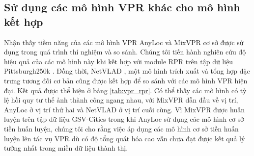 \subsection{Sử dụng các mô hình VPR khác cho mô hình kết hợp}

Nhận thấy tiềm năng của các mô hình VPR AnyLoc \cite{keetha2023anyloc} và MixVPR cơ sở \cite{alibey2023mixvpr} được sử dụng trong quá trình thí nghiệm và so sánh. Chúng tôi tiến hành nghiên cứu độ hiệu quả của các mô hình này khi kết hợp với module RPR trên tập dữ liệu Pittsburgh250k \cite{6618963}. Đồng thời, NetVLAD \cite{arandjelovic2016netvlad}, một mô hình trích xuất và tổng hợp đặc trưng tương đối cơ bản cũng được kết hợp để so sánh với các mô hình VPR hiện đại. Kết quả được thể hiện ở bảng \ref{tab:vpr_rpr}. Có thể thấy các mô hình có tỷ lệ hồi quy tư thế ảnh thành công ngang nhau, với MixVPR dẫn đầu về vị trí, AnyLoc ở vị trí thứ hai và NetVLAD ở vị trí cuối cùng. Vì MixVPR được huấn luyện trên tập dữ liệu GSV-Cities \cite{Ali_bey_2022} trong khi AnyLoc sử dụng các mô hình cơ sở tiền huấn luyện, chúng tôi cho rằng việc áp dụng các mô hình cơ sở tiền huấn luyện lên tác vụ VPR dù có độ tổng quát hóa cao vẫn chưa đạt được kết quả lý tưởng nhất trong miền dữ liệu thành thị.

